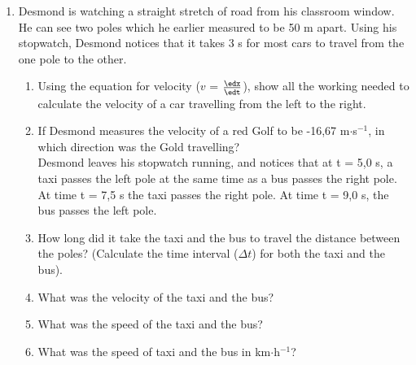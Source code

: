 {\begin{enumerate}
\item Desmond is watching a straight stretch of road from his classroom window. He can see two poles which he earlier measured to be 50 m apart. Using his stopwatch, Desmond notices that it takes 3 s for most cars to travel from the one pole to the other.\begin{enumerate}
\item Using the equation for velocity ($v$ = $\frac{\edx}{\edt}$), show all the working needed to calculate the velocity of a car travelling from the left to the right.
\item If Desmond measures the velocity of a red Golf to be -16,67 m$\cdot$s$^{-1}$, in which direction was the Gold travelling?\\
Desmond leaves his stopwatch running, and notices that at t = 5,0 s, a taxi passes the left pole at the same time as a bus passes the right pole. At time t = 7,5 s the taxi passes the right pole. At time t = 9,0 s, the bus passes the left pole.\\
\item How long did it take the taxi and the bus to travel the distance between the poles?
(Calculate the time interval ($\Delta t$) for both the taxi and the bus).
\item What was the velocity of the taxi and the bus?
\item What was the speed of the taxi and the bus?
\item What was the speed of taxi and the bus in km$\cdot$h$^{-1}$?
\end{enumerate}


\end{enumerate}}
